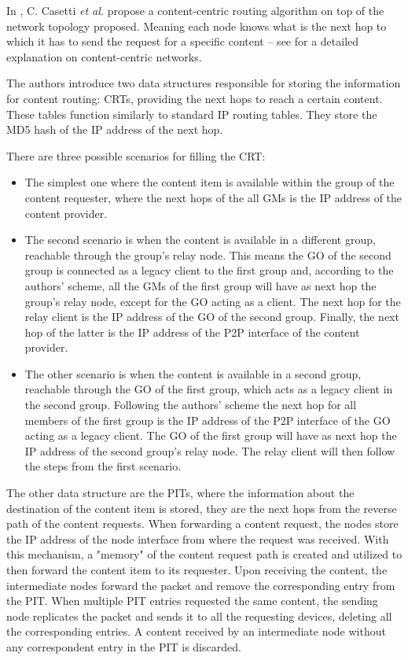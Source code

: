 In \cite{routeMultiGroup}, C. Casetti \textit{et al.} propose a content-centric routing algorithm on top of the network topology proposed. Meaning each node knows what is the next hop to which it has to send the request for a specific content -- see \cite{contentcentric} for a detailed explanation on content-centric networks.

The authors introduce two data structures responsible for storing the information for content routing: \glspl{CRT}, providing the next hops to reach a certain content. These tables function similarly to standard \gls{IP} routing tables. They store the MD5 hash of the \gls{IP} address of the next hop.

There are three possible scenarios for filling the \gls{CRT}:
\begin{itemize}
\item The simplest one where the content item is available within the group of the content requester, where the next hops of the all \glspl{GM} is the \gls{IP} address of the content provider.

\item The second scenario is when the content is available in a different group, reachable through the group's relay node. This means the \gls{GO} of the second group is connected as a legacy client to the first group and, according to the authors' scheme, all the \glspl{GM} of the first group will have as next hop the group's relay node, except for the \gls{GO} acting as a client. The next hop for the relay client is the \gls{IP} address of the \gls{GO} of the second group. Finally, the next hop of the latter is the \gls{IP} address of the P2P interface of the content provider.

\item The other scenario is when the content is available in a second group, reachable through the \gls{GO} of the first group, which acts as a legacy client in the second group. Following the authors' scheme the next hop for all members of the first group is the \gls{IP} address of the P2P interface of the \gls{GO} acting as a legacy client. The \gls{GO} of the first group will have as next hop the \gls{IP} address of the second group's relay node. The relay client will then follow the steps from the first scenario.
\end{itemize}

The other data structure are the \glspl{PIT}, where the information about the destination of the content item is stored, they are the next hops from the reverse path of the content requests. When forwarding a content request, the nodes store the \gls{IP} address of the node interface from where the request was received. With this mechanism, a "memory" of the content request path is created and utilized to then forward the content item to its requester. Upon receiving the content, the intermediate nodes forward the packet and remove the corresponding entry from the \gls{PIT}. When multiple \gls{PIT} entries requested the same content, the sending node replicates the packet and sends it to all the requesting devices, deleting all the corresponding entries. A content received by an intermediate node without any correspondent entry in the \gls{PIT} is discarded.


